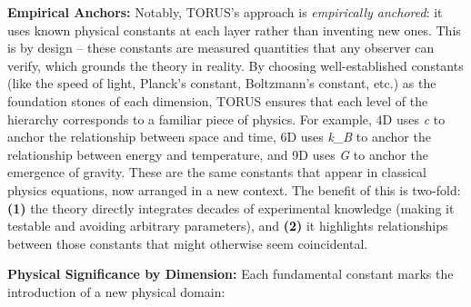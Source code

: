 \documentclass[
]{article}
\begin{document}
\textbf{Empirical Anchors:} Notably, TORUS's approach is
\emph{empirically anchored}: it uses known physical constants at each
layer rather than inventing new ones. This is by design -- these
constants are measured quantities that any observer can verify, which
grounds the theory in reality\hspace{0pt}. By choosing well-established
constants (like the speed of light, Planck's constant, Boltzmann's
constant, etc.) as the foundation stones of each dimension, TORUS
ensures that each level of the hierarchy corresponds to a familiar piece
of physics. For example, 4D uses \emph{c} to anchor the relationship
between space and time, 6D uses
\emph{k_{B}{}} to anchor
the relationship between energy and temperature, and 9D uses \emph{G} to
anchor the emergence of gravity. These are the same constants that
appear in classical physics equations, now arranged in a new context.
The benefit of this is two-fold: \textbf{(1)} the theory directly
integrates decades of experimental knowledge (making it testable and
avoiding arbitrary parameters), and \textbf{(2)} it highlights
relationships between those constants that might otherwise seem
coincidental.

\textbf{Physical Significance by Dimension:} Each fundamental constant
marks the introduction of a new physical domain:
\end{document}
